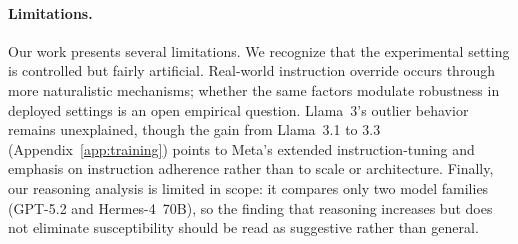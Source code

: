 \paragraph{Limitations.}

Our work presents several limitations. We recognize that the experimental setting is controlled but fairly artificial. Real-world instruction override occurs through more naturalistic mechanisms; whether the same factors modulate robustness in deployed settings is an open empirical question. Llama~3's outlier behavior remains unexplained, though the gain from Llama~3.1 to 3.3 (Appendix~\ref{app:training}) points to Meta's extended instruction-tuning and emphasis on instruction adherence rather than to scale or architecture. Finally, our reasoning analysis is limited in scope: it compares only two model families (GPT-5.2 and Hermes-4~70B), so the finding that reasoning increases but does not eliminate susceptibility should be read as suggestive rather than general.




